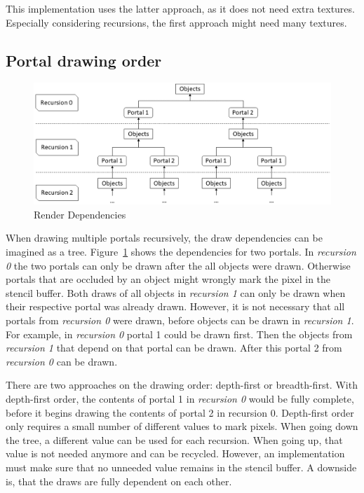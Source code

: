 This implementation uses the latter approach, as it does not need extra textures. Especially considering recursions, the first approach might need many textures. 

\subsection{Portal drawing order}

\begin{figure}[h]
	\includegraphics[width=\linewidth]{images/rendertree.png}
	\caption{Render Dependencies}
	\label{fig:rendertree}
\end{figure}


When drawing multiple portals recursively, the draw dependencies can be imagined as a tree. Figure~\ref{fig:rendertree} shows the dependencies for two portals. In \textit{recursion 0} the two portals can only be drawn after the all objects were drawn. Otherwise portals that are occluded by an object might wrongly mark the pixel in the stencil buffer. Both draws of all objects in \textit{recursion 1} can only be drawn when their respective portal was already drawn. However, it is not necessary that all portals from \textit{recursion 0} were drawn, before objects can be drawn in \textit{recursion 1}. For example, in \textit{recursion 0} portal 1 could be drawn first. Then the objects from \textit{recursion 1} that depend on that portal can be drawn. After this portal 2 from \textit{recursion 0} can be drawn.

There are two approaches on the drawing order: depth-first or breadth-first. With depth-first order, the contents of portal 1 in \textit{recursion 0} would be fully complete, before it begins drawing the contents of portal 2 in recursion 0. Depth-first order only requires a small number of different values to mark pixels. When going down the tree, a different value can be used for each recursion. When going up, that value is not needed anymore and can be recycled. However, an implementation must make sure that no unneeded value remains in the stencil buffer. A downside is, that the draws are fully dependent on each other.

